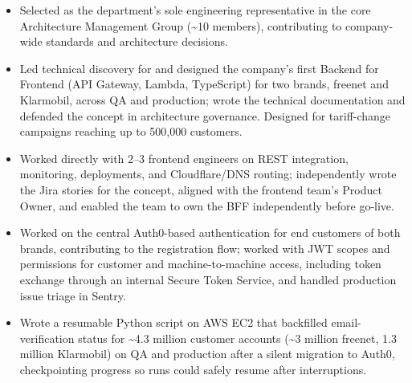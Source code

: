 \documentclass[10pt,letterpaper]{article}
\begin{document}
\begin{itemize}
  \item Selected as the department's sole engineering representative in the core Architecture Management Group (\textasciitilde 10 members), contributing to company-wide standards and architecture decisions.
  \item Led technical discovery for and designed the company's first Backend for Frontend (API Gateway, Lambda, TypeScript) for two brands, freenet and Klarmobil, across QA and production; wrote the technical documentation and defended the concept in architecture governance. Designed for tariff-change campaigns reaching up to 500,000 customers.
  \item Worked directly with 2--3 frontend engineers on REST integration, monitoring, deployments, and Cloudflare/DNS routing; independently wrote the Jira stories for the concept, aligned with the frontend team's Product Owner, and enabled the team to own the BFF independently before go-live.
  \item Worked on the central Auth0-based authentication for end customers of both brands, contributing to the registration flow; worked with JWT scopes and permissions for customer and machine-to-machine access, including token exchange through an internal Secure Token Service, and handled production issue triage in Sentry.
  \item Wrote a resumable Python script on AWS EC2 that backfilled email-verification status for \textasciitilde 4.3 million customer accounts (\textasciitilde 3 million freenet, 1.3 million Klarmobil) on QA and production after a silent migration to Auth0, checkpointing progress so runs could safely resume after interruptions.
\end{itemize}
\end{document}
